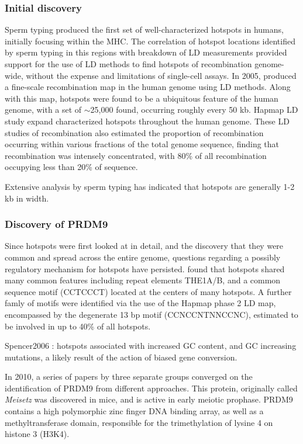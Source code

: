 \subsubsection{Initial discovery}

Sperm typing produced the first set of well-characterized hotspots in humans, initially focusing within the MHC\cite{Jeffreys2000,Jeffreys2001}.
The correlation of hotspot locations identified by sperm typing in this regions with breakdown of LD measurements provided support for the use of LD methods to find hotspots of recombination genome-wide, without the expense and limitations of single-cell assays\cite{Jeffreys2001}.
In 2005, \citet{Myers2005} produced a fine-scale recombination map in the human genome using LD methods.
Along with this map, hotspots were found to be a ubiquitous feature of the human genome, with a set of $\sim$25,000 found, occurring roughly every 50 kb.
Hapmap LD study expand characterized hotspots throughout the human genome.
These LD studies of recombination also estimated the proportion of recombination occurring within various fractions of the total genome sequence, finding that recombination was intensely concentrated, with 80\% of all recombination occupying less than 20\% of sequence.

Extensive analysis by sperm typing has indicated that hotspots are generally 1-2 kb in width\cite{Jeffreys2004a,Arnheim2003}.


\subsubsection{Discovery of PRDM9}

Since hotspots were first looked at in detail, and the discovery that they were common and spread across the entire genome, questions regarding a possibly regulatory mechanism for hotspots have persisted.
\citet{Myers2005} found that hotspots shared many common features including repeat elements THE1A/B, and a common sequence motif (CCTCCCT) located at the centers of many hotspots.
A further famly of motifs were identified via the use of the Hapmap phase 2 LD map\cite{hapmap2007}, encompassed by the degenerate 13 bp motif (CCNCCNTNNCCNC)\cite{Myers2008}, estimated to be involved in up to 40\% of all hotspots.

Spencer2006 : hotspots associated with increased GC content, and GC increasing mutations, a likely result of the action of biased gene conversion.


In 2010, a series of papers by three separate groups converged on the identification of PRDM9 from different approaches.
This protein, originally called \textit{Meisetz} was discovered in mice, and is active in early meiotic prophase\cite{Hayashi2005}.
PRDM9 contains a high polymorphic zinc finger DNA binding array, as well as a methyltransferase domain, responsible for the trimethylation of lysine 4 on histone 3 (H3K4).

